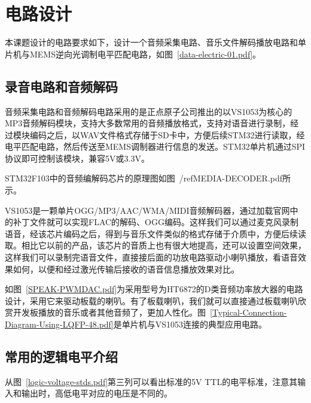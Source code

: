 \chapter{电路设计}
本课题设计的电路要求如下，设计一个音频采集电路、音乐文件解码播放电路和单片机与MEMS逆向光调制电平匹配电路，如图~\ref{data-electric-01.pdf}。
\section{录音电路和音频解码}
音频采集电路和音频解码电路采用的是正点原子公司推出的以VS1053为核心的MP3音频解码模块，支持大多数常用的音频播放格式，支持对语音进行录制，经过模块编码之后，以WAV文件格式存储于SD卡中，方便后续STM32进行读取，经电平匹配电路，然后传送至MEMS调制器进行信息的发送。STM32单片机通过SPI协议即可控制该模块，兼容5V或3.3V。


STM32F103中的音频编解码芯片的原理图如图~/ref{MEDIA-DECODER.pdf}所示。

VS1053是一颗单片OGG/MP3/AAC/WMA/MIDI音频解码器，通过加载官网中的补丁文件就可以实现FLAC的解码、OGG编码。这样我们可以通过麦克风录制语音，经该芯片编码之后，得到与音乐文件类似的格式存储于介质中，方便后续读取。相比它以前的产品，该芯片的音质上也有很大地提高，还可以设置空间效果，这样我们可以录制完语音文件，直接接后面的功放电路驱动小喇叭播放，看语音效果如何，以便和经过激光传输后接收的语音信息播放效果对比。






如图~\ref{SPEAK-PWMDAC.pdf}为采用型号为HT6872的D类音频功率放大器的电路设计，采用它来驱动板载的喇叭。有了板载喇叭，我们就可以直接通过板载喇叭欣赏开发板播放的音乐或者其他音频了，更加人性化。图~\ref{Typical-Connection-Diagram-Using-LQFP-48.pdf}是单片机与VS1053连接的典型应用电路。




\section{常用的逻辑电平介绍}
从图~\ref{logic-voltage-stds.pdf}第三列可以看出标准的5V TTL的电平标准，注意其输入和输出时，高低电平对应的电压是不同的。



